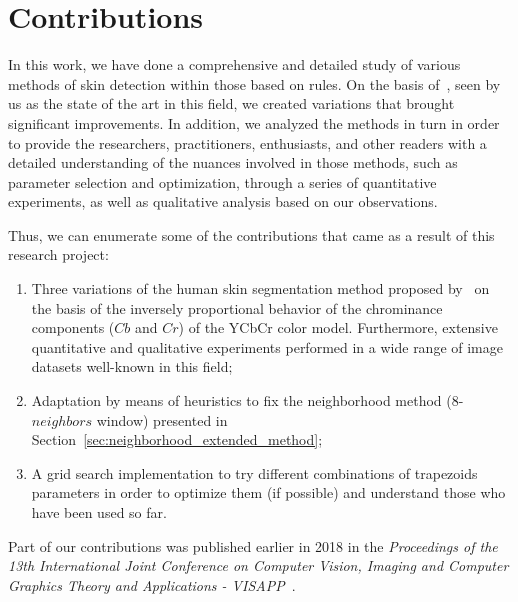 \section{Contributions}
\label{sec:contributions}

In this work, we have done a comprehensive and detailed study of various methods of skin detection within those based on rules. On the basis of~\citet{brancati:17}, seen by us as the state of the art in this field, we created variations that brought significant improvements. In addition, we analyzed the methods in turn in order to provide the researchers, practitioners, enthusiasts, and other readers with a detailed understanding of the nuances involved in those methods, such as parameter selection and optimization, through a series of quantitative experiments, as well as qualitative analysis based on our observations.

Thus, we can enumerate some of the contributions that came as a result of this research project:
\begin{enumerate}
    \item Three variations of the human skin segmentation method proposed by~\citet{brancati:17} on the basis of the inversely proportional behavior of the chrominance components ($Cb$ and $Cr$) of the YCbCr color model. Furthermore, extensive quantitative and qualitative experiments performed in a wide range of image datasets well-known in this field;
    \item Adaptation by means of heuristics to fix the neighborhood method (8-$neighbors$ window) presented in Section~\ref{sec:neighborhood_extended_method};
    \item A grid search implementation to try different combinations of trapezoids parameters in order to optimize them (if possible) and understand those who have been used so far.
\end{enumerate}

Part of our contributions was published earlier in 2018 in the \emph{Proceedings of the 13th International Joint Conference on Computer Vision, Imaging and Computer Graphics Theory and Applications - VISAPP}~\citep{faria:18}.


